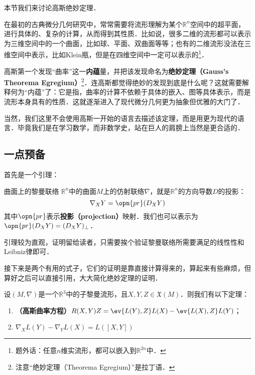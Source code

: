 

本节我们来讨论高斯绝妙定理．

在最初的古典微分几何研究中，常常需要将流形理解为某个$\mathbb{R}^n$空间中的超平面，进行具体的、复杂的计算，从而得到其性质．比如说，很多二维的流形都可以表示为三维空间中的一个曲面，比如球、平面、双曲面等等；也有的二维流形没法在三维空间中表示，比如Klein瓶，但是在四维空间中一定可以表示的\footnote{题外话：任意$n$维实流形，都可以嵌入到$\mathbb{R}^{2n}$中．}．

高斯第一个发现“曲率”这一\textbf{内蕴}量，并把该发现命名为\textbf{绝妙定理（Gauss's Theorema Egregium）}\footnote{注意“绝妙定理（Theorema Egregium）”是拉丁语．}．连高斯都觉得绝妙的发现到底是什么呢？这就需要解释何为“内蕴”了：它是指，曲率的计算不依赖于具体的嵌入、图等具体表示，而是流形本身具有的性质．这就逐渐进入了现代微分几何更为抽象但优雅的大门了．

当然，我们这里不会使用高斯一开始的语言去描述该定理，而是用更为现代的语言．毕竟我们是在学习数学，而非数学史，站在巨人的肩膀上当然是更合适的．

\subsection{一点预备}

首先是一个引理：

\begin{lemma}{曲面上的黎曼联络}\label{Egreg_lem1}
$\mathbb{R}^n$中的曲面$M$上的仿射联络$\nabla$，就是$\mathbb{R}^n$的方向导数$D$的投影：
\begin{equation}
\nabla_XY=\opn{pr}(D_XY)
\end{equation}
其中$\opn{pr}$表示\textbf{投影（projection）}映射．我们也可以表示为$\opn{pr}(D_XY)=(D_XY)_\perp$．
\end{lemma}

引理较为直观，证明留给读者，只需要挨个验证黎曼联络所需要满足的线性性和Leibniz律即可．

接下来是两个有用的式子，它们的证明是靠直接计算得来的，算起来有些麻烦，但算好之后可以直接引用，大大简化绝妙定理的证明．

\begin{theorem}{}\label{Egreg_the1}
设$(M, \nabla)$是一个$\mathbb{R}^3$中的子黎曼流形，且$X, Y, Z\in\mathfrak{X}(M)$．则我们有以下定理：
\begin{enumerate}
\item \textbf{（高斯曲率方程）}$R(X, Y)Z=\ev{L(Y), Z}L(X)-\ev{L(X), Z}L(Y)$；
\item $\nabla_XL(Y)-\nabla_YL(X)=L([X, Y])$
\end{enumerate}
\end{theorem}

